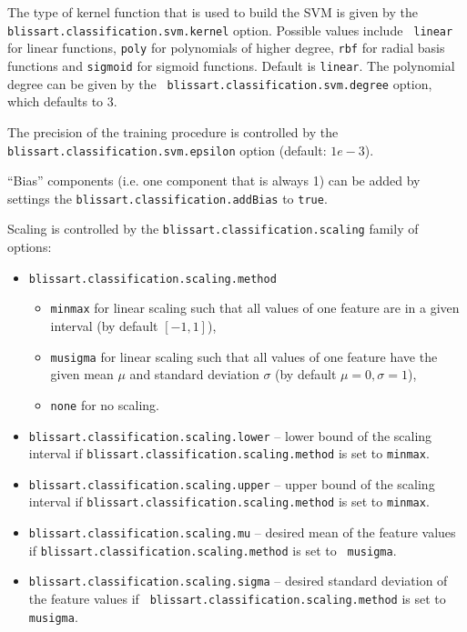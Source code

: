 The type of kernel function that is used to build the SVM is given by the {\tt
  blissart.classification.svm.kernel} option. Possible values include {\tt
  linear} for linear functions, {\tt poly} for polynomials of higher degree,
{\tt rbf} for radial basis functions and {\tt sigmoid} for sigmoid functions.
Default is {\tt linear}. The polynomial degree can be given by the {\tt
  blissart.classification.svm.degree} option, which defaults to 3.
       
The precision of the training procedure is controlled by the {\tt
  blissart.classification.svm.epsilon} option (default: $1e-3$).
   
``Bias'' components (i.e. one component that is always 1) can be added by
settings the {\tt blissart.classification.addBias} to {\tt true}.

Scaling is controlled by the {\tt blissart.classification.scaling} family of
options:

\begin{itemize}
  \item {\tt blissart.classification.scaling.method}
    \begin{itemize}
      \item {\tt minmax} for linear scaling such that all values of one feature
        are in a given interval (by default $[-1,1]$),
      \item {\tt musigma} for linear scaling such that all values of one feature
        have the given mean $\mu$ and standard deviation $\sigma$ (by default
        $\mu = 0, \sigma = 1$),
      \item {\tt none} for no scaling.
    \end{itemize}
  \item {\tt blissart.classification.scaling.lower} -- lower bound of the
    scaling interval if {\tt blissart.classification.scaling.method} is set to
    {\tt minmax}.
  \item {\tt blissart.classification.scaling.upper} -- upper bound of the
    scaling interval if {\tt blissart.classification.scaling.method} is set to
    {\tt minmax}.
  \item {\tt blissart.classification.scaling.mu} -- desired mean of the feature
    values if {\tt blissart.classification.scaling.method} is set to {\tt
      musigma}.
  \item {\tt blissart.classification.scaling.sigma} -- desired standard
    deviation of the feature values if {\tt
      blissart.classification.scaling.method} is set to {\tt musigma}.
\end{itemize}


